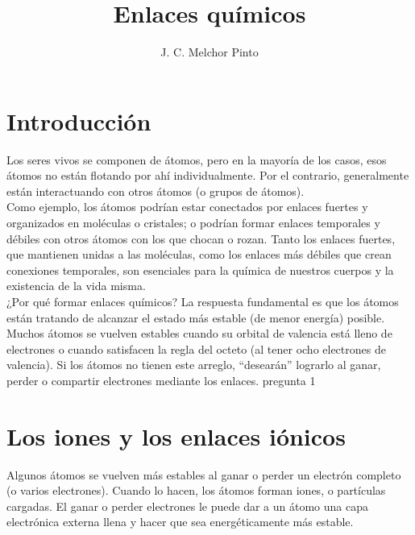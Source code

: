 \documentclass[12pt]{guia}
\title{Enlaces químicos}
\author{J. C. Melchor Pinto}
\begin{document}
\pagestyle{headandfoot}
\addpoints
\INFO
\printanswers
\begin{multicols}{2}
    
    
    
\end{multicols}
\begin{questions}
    \section{Introducción}
    \vbox{\leftskip\leftmargin Los seres vivos se componen de átomos, pero en la mayoría de los casos, esos átomos no están flotando por ahí individualmente. Por el contrario, generalmente están interactuando con otros átomos (o grupos de átomos).\\

        Como ejemplo, los átomos podrían estar conectados por enlaces fuertes y organizados en moléculas o cristales; o podrían formar enlaces temporales y débiles con otros átomos con los que chocan o rozan. Tanto los enlaces fuertes, que mantienen unidas a las moléculas, como los enlaces más débiles que crean conexiones temporales, son esenciales para la química de nuestros cuerpos y la existencia de la vida misma.\\

        ¿Por qué formar enlaces químicos? La respuesta fundamental es que los átomos están tratando de alcanzar el estado más estable (de menor energía) posible. Muchos átomos se vuelven estables cuando su orbital de valencia está lleno de electrones o cuando satisfacen la regla del octeto (al tener ocho electrones de valencia). Si los átomos no tienen este arreglo, ``desearán'' lograrlo al ganar, perder o compartir electrones mediante los enlaces.}
    \question[99] pregunta 1



    \section{Los iones y los enlaces iónicos}

    Algunos átomos se vuelven más estables al ganar o perder un electrón completo (o varios electrones). Cuando lo hacen, los átomos forman iones, o partículas cargadas. El ganar o perder electrones le puede dar a un átomo una capa electrónica externa llena y hacer que sea energéticamente más estable.


\end{questions}
\end{document}
